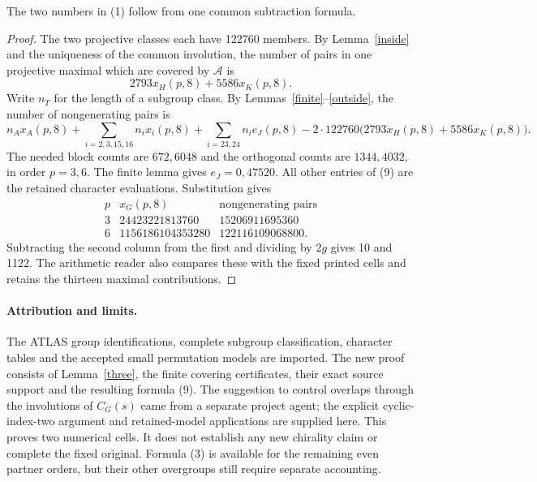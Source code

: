 \documentclass[11pt,a4paper]{article}
\begin{document}
\begin{theorem}
The two numbers in (1) follow from one common subtraction formula.
\end{theorem}
\begin{proof}
The two projective classes each have 122760 members. By
Lemma~\ref{inside} and the uniqueness of the common involution,
the number of pairs in one projective maximal which are covered by
$\mathcal A$ is
\[
                       2793x_H(p,8)+5586x_K(p,8).             \tag{8}
\]
Write $n_T$ for the length of a subgroup class. By
Lemmas~\ref{finite}--\ref{outside}, the number of nongenerating pairs is
\[
 n_Ax_A(p,8)+\sum_{i=2,3,15,16}n_i x_i(p,8)
 +\sum_{i=23,24}n_i e_J(p,8)
 -2\cdot122760\bigl(2793x_H(p,8)+5586x_K(p,8)\bigr).          \tag{9}
\]
The needed block counts are $672,6048$ and the orthogonal counts are
$1344,4032$, in order $p=3,6$. The finite lemma gives $e_J=0,47520$.
All other entries of (9) are the retained character evaluations.
Substitution gives
\[
\begin{array}{c|rr}
 p&x_G(p,8)&\text{nongenerating pairs}\\\hline
3&24423221813760&15206911695360\\
6&1156186104353280&122116109068800.
\end{array}
\]
Subtracting the second column from the first and dividing by $2g$
gives 10 and 1122. The arithmetic reader also compares these with
the fixed printed cells and retains the thirteen maximal contributions.
\end{proof}

\paragraph{Attribution and limits.}
The ATLAS group identifications, complete subgroup classification,
character tables and the accepted small permutation models are imported.
The new proof consists of Lemma~\ref{three}, the finite covering
certificates, their exact source support and the resulting formula (9).
The suggestion to control overlaps through the involutions of $C_G(s)$
came from a separate project agent; the explicit cyclic-index-two
argument and retained-model applications are supplied here.
This proves two numerical cells. It does not establish any new chirality
claim or complete the fixed original. Formula (3) is available for the
remaining even partner orders, but their other overgroups still require
separate accounting.
\end{document}
